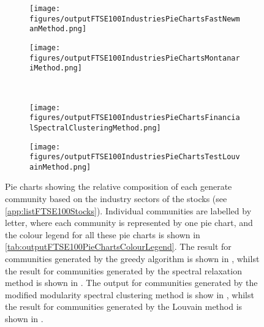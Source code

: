 \begin{figure}
\centering
	\begin{subfigure}{.5\textwidth}
		\centering
		\texttt{[image: figures/outputFTSE100IndustriesPieChartsFastNewmanMethod.png]}
		\caption{}
		\label{fig:outputPieChartsCommunitiesGreedy}
	\end{subfigure}%
	\begin{subfigure}{.5\textwidth}
		\centering
		\texttt{[image: figures/outputFTSE100IndustriesPieChartsMontanariMethod.png]}
		\caption{}
		\label{fig:outputPieChartsCommunitiesSpectralRelaxation}
	\end{subfigure}\\
	\begin{subfigure}{.5\textwidth}
		\centering
		\texttt{[image: figures/outputFTSE100IndustriesPieChartsFinancialSpectralClusteringMethod.png]}
		\caption{}
		\label{fig:outputPieChartsCommunitiesSpectralClustering}
	\end{subfigure}%
	\begin{subfigure}{.5\textwidth}
		\centering
		\texttt{[image: figures/outputFTSE100IndustriesPieChartsTestLouvainMethod.png]}
		\caption{}
		\label{fig:outputPieChartsCommunitiesTestLouvainMethod}
	\end{subfigure}
	\caption[Pie charts showing the relative composition of each generated community based on industry sectors of the FTSE 100 stocks for four different algorithms.]{\label{fig:outputFTSE100PieCharts} Pie charts showing the relative composition of each generate community based on the industry sectors of the stocks (see \cref{app:listFTSE100Stocks}). Individual communities are labelled by letter, where each community is represented by one pie chart, and the colour legend for all these pie charts is shown in \cref{tab:outputFTSE100PieChartsColourLegend}. The result for communities generated by the greedy algorithm is shown in , whilst the result for communities generated by the spectral relaxation method is shown in . The output for communities generated by the modified modularity spectral clustering method is show in , whilst the result for communities generated by the Louvain method is shown in .}
\end{figure}


